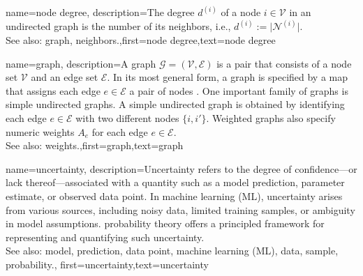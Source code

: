 {name={node degree},
	description={The degree $d^{(i)}$ of a node $i \in \mathcal{V}$ 
		in an undirected graph is the number of its neighbors, i.e., $d^{(i)} := \big|\mathcal{N}^{(i)}\big|$.
					\\ 
		See also: graph, neighbors.},first={node degree},text={node degree} 
}

{name={graph},
	description={A graph $\mathcal{G} = \left( \mathcal{V},\mathcal{E} \right)$ is a pair that consists of 
		a node set $\mathcal{V}$ and an edge set $\mathcal{E}$. In its most general form, a graph is 
		specified by a map that assigns each edge $e \in \mathcal{E}$ a pair of nodes \cite{RockNetworks}. 
		One important family of graphs is simple undirected graphs. A simple undirected graph 
		is obtained by identifying each edge $e \in \mathcal{E}$ with two different nodes $\{i,i'\}$. 
		Weighted graphs also specify numeric weights $A_{e}$ for each 
		edge $e \in \mathcal{E}$.
					\\ 
		See also: weights.},first={graph},text={graph} 
}

{name={uncertainty},
	description={Uncertainty refers to the degree of confidence—or 
		lack thereof—associated with a quantity such as a model prediction, parameter estimate, or 
		observed data point. In machine learning (ML), uncertainty arises from various sources, including 
		noisy data, limited training samples, or ambiguity in model assumptions. \Gls{probability} theory 
		offers a principled framework for representing and quantifying such uncertainty.
					\\ 
		See also: model, prediction, data point, machine learning (ML), data, sample, probability.},
	first={uncertainty},text={uncertainty}
}

